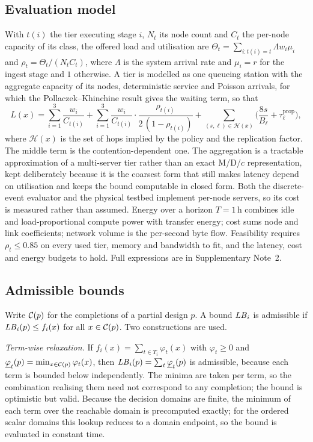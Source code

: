 \subsection{Evaluation model}
With $t(i)$ the tier executing stage $i$, $N_t$ its node count and $C_t$ the per-node
capacity of its class, the offered load and utilisation are
$\Theta_t=\sum_{i:t(i)=t}\Lambda w_i\mu_i$ and $\rho_t=\Theta_t/(N_tC_t)$, where
$\Lambda$ is the system arrival rate and $\mu_i=r$ for the ingest stage and $1$
otherwise. A tier is modelled as one queueing station with the aggregate capacity of its
nodes, deterministic service and Poisson arrivals, for which the Pollaczek--Khinchine
result gives the waiting term\cite{kleinrock1975queueing,harchol2013performance}, so
that
\begin{equation}
L(x)=\sum_{i=1}^{3}\frac{w_i}{C_{t(i)}}
+\sum_{i=1}^{3}\frac{w_i}{C_{t(i)}}\cdot\frac{\rho_{t(i)}}{2\,(1-\rho_{t(i)})}
+\sum_{(s,\ell)\in\mathcal{H}(x)}\Big(\frac{8s}{B_\ell}+\tau^{\mathrm{prop}}_\ell\Big),
\label{eq:ce:latency}
\end{equation}
where $\mathcal{H}(x)$ is the set of hops implied by the policy and the replication
factor. The middle term is the contention-dependent one. The aggregation is a tractable approximation of a multi-server tier rather than an exact
M/D/$c$ representation, kept deliberately because it is the coarsest form that still makes
latency depend on utilisation and keeps the bound computable in closed form. Both the discrete-event
evaluator and the physical testbed implement per-node servers, so its cost is measured
rather than assumed. Energy over a horizon $T=1$\,h combines idle and load-proportional
compute power with transfer energy; cost sums node and link coefficients; network volume
is the per-second byte flow. Feasibility requires $\rho_t\le0.85$ on every used tier,
memory and bandwidth to fit, and the latency, cost and energy budgets to hold. Full
expressions are in Supplementary Note~2.

\subsection{Admissible bounds}
Write $\mathcal{C}(p)$ for the completions of a partial design $p$. A bound $\mathit{LB}_i$ is admissible
if $\mathit{LB}_i(p)\le f_i(x)$ for all $x\in\mathcal{C}(p)$. Two constructions are used.

\emph{Term-wise relaxation.} If $f_i(x)=\sum_{t\in T_i}\varphi_t(x)$ with
$\varphi_t\ge0$ and $\underline{\varphi}_t(p)=\min_{x\in\mathcal{C}(p)}\varphi_t(x)$, then
$\mathit{LB}_i(p)=\sum_t\underline{\varphi}_t(p)$ is admissible, because each term is bounded
below independently. The minima are taken per term, so the combination realising them
need not correspond to any completion; the bound is optimistic but valid. Because the decision domains are finite, the minimum of each term over the reachable
domain is precomputed exactly; for the ordered scalar domains this lookup reduces to a
domain endpoint, so the bound is evaluated in constant time.

